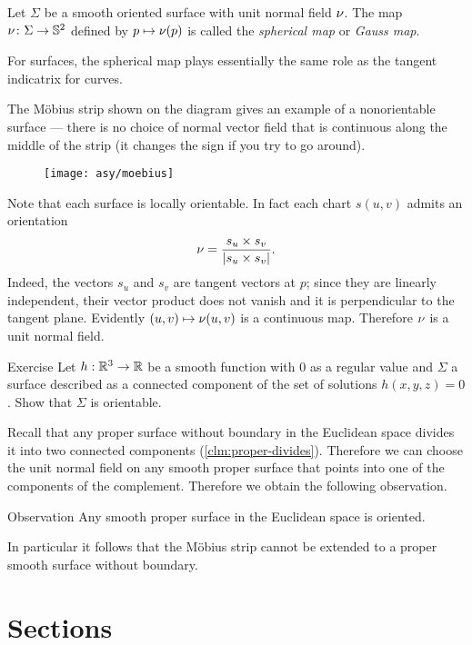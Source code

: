 Let $\Sigma$ be a smooth oriented surface with unit normal field $\nu$.
The map $\nu\colon\Sigma\to \mathbb{S}^2$ defined by $p\mapsto \nu(p)$ is called the \emph{spherical map} or \emph{Gauss map}.

For surfaces, the spherical map plays essentially the same role as the tangent indicatrix for curves.

The M\"obius strip shown on the diagram gives an example of a nonorientable surface --- there is no choice of normal vector field that is continuous along the middle of the strip (it changes the sign if you try to go around).

\begin{wrapfigure}{o}{42 mm}
\vskip-0mm
\centering
\texttt{[image: asy/moebius]}
\vskip0mm
\end{wrapfigure}

Note that each surface is locally orientable.
In fact each chart $s(u,v)$ admits an orientation 
\[\nu=
\frac{s_u\times s_v}
{\left|s_u\times s_v\right|}.\]
Indeed, the vectors $s_u$ and $s_v$ are tangent vectors at $p$; 
since they are linearly independent, their vector product does not vanish and it is perpendicular to the tangent plane.
Evidently $(u,v)\mapsto \nu(u,v)$ is a continuous map.
Therefore $\nu$ is a unit normal field. 

\begin{thm}{Exercise}\label{ex:implicit-orientable}
Let $h:\mathbb{R}^3\to\mathbb{R}$ be a smooth function with $0$ as a regular value and $\Sigma$ a surface described as a connected component of the set of solutions $h(x,y,z)=0$.
Show that $\Sigma$ is orientable.
\end{thm}

Recall that any proper surface without boundary in the Euclidean space divides it into two connected components (\ref{clm:proper-divides}).
Therefore we can choose the unit normal field on any smooth proper surface that points into one of the components of the complement.
Therefore we obtain the following observation. 

\begin{thm}{Observation}
Any smooth proper surface in the Euclidean space is oriented.
\end{thm}

In particular it follows that the M\"obius strip cannot be extended to a proper smooth surface without boundary.

\section{Sections}

